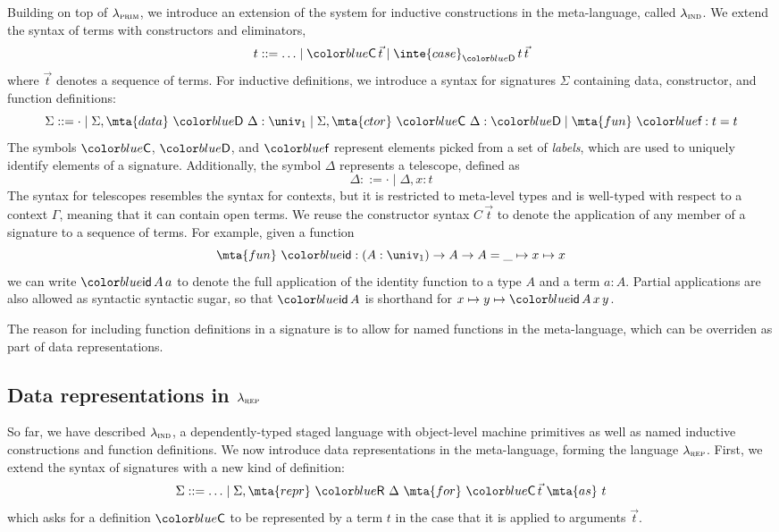 Building on top of $\lambda_{\textsc{prim}}$, we introduce an extension of the system for
inductive constructions in the meta-language, called $\lambda_{\textsc{ind}}$. We extend
the syntax of terms with constructors and eliminators,
\[
  t ::= \ldots \mid \lab{C} \, \vec{t} \mid \inte{case}_{\lab{D}} \, t \, \vec{t}
\]
where $\vec{t}$ denotes a sequence of terms. For inductive definitions, we
introduce a syntax for signatures $\Sigma$ containing data, constructor, and
function definitions:
\[
  \Sigma ::= \cdot \mid \Sigma, \mta{data} \ \lab{D} \ \Delta : \univ_1 \mid \Sigma, \mta{ctor} \ \lab{C} \ \Delta : \lab{D} \mid \mta{fun} \ \lab{f} : t = t
\]
The symbols $\lab{C}$, $\lab{D}$, and $\lab{f}$ represent elements picked from
a set of \emph{labels}, which are used to uniquely identify elements of a
signature. Additionally, the symbol $\Delta$ represents a telescope, defined as
\[
  \Delta ::= \cdot \mid \Delta, x : t
\]
The syntax for telescopes resembles the syntax for contexts, but it is
restricted to meta-level types and is well-typed with respect to a context
$\Gamma$, meaning that it can contain open terms. We reuse the constructor
syntax $C \, \vec{t}$ to denote the application of any member of a signature to
a sequence of terms. For example, given a function
\[
  \mta{fun} \ \lab{id} : (A : \univ_1) \to A \to A = \_ \mapsto x \mapsto x
\]
we can write $\lab{id} \, A \, a$ to denote the full application of the
identity function to a type $A$ and a term $a : A$. Partial applications are
also allowed as syntactic syntactic sugar, so that $\lab{id} \, A$ is shorthand
for $x \mapsto y \mapsto \lab{id} \, A \, x \, y$.

The reason for including function definitions in a signature is to allow for
named functions in the meta-language, which can be overriden as part of data
representations.

\subsection{Data representations in $\lambda_{\textsc{rep}}$}

So far, we have described $\lambda_{\textsc{ind}}$, a dependently-typed staged language
with object-level machine primitives as well as named inductive constructions
and function definitions. We now introduce data representations in the
meta-language, forming the language $\lambda_{\textsc{rep}}$. First, we extend the syntax
of signatures with a new kind of definition:
\[
  \Sigma ::= \ldots \mid \Sigma, \mta{repr} \ \lab{R} \ \Delta \ \mta{for} \ \lab{C}\,\vec{t}\ \mta{as}\ t
\]
which asks for a definition $\lab{C}$ to be represented by a term $t$ in the
case that it is applied to arguments $\vec{t}$.


